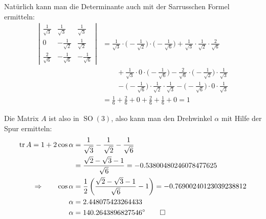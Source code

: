 \begin{loesung}
\begin{teilaufgaben}
Natürlich kann man die Determinante auch mit der Sarrusschen Formel ermitteln:
\begin{align*}
\left|
\begin{matrix}
\frac1{\sqrt{3}}&\frac1{\sqrt{3}}&\frac1{\sqrt{3}}\\
0&-\frac1{\sqrt{2}}&\frac1{\sqrt{2}}\\
\frac2{\sqrt{6}}&-\frac1{\sqrt{6}}&-\frac1{\sqrt{6}}
\end{matrix}
\right|
&=
\frac1{\sqrt{3}}\cdot\biggl(-\frac1{\sqrt{2}}\biggr)\cdot\biggl(-\frac1{\sqrt{6}}\biggr)
+
\frac1{\sqrt{3}}\cdot\frac1{\sqrt{2}}\cdot\frac2{\sqrt{6}}
\\
&\qquad 
+
\frac1{\sqrt{3}}\cdot0\cdot\biggl(-\frac1{\sqrt{6}}\biggr)
-
\frac2{\sqrt{6}}\cdot\biggl(-\frac1{\sqrt{2}}\biggr)\cdot\frac1{\sqrt{3}}
\\
&\qquad
-
\biggl(-\frac1{\sqrt{6}}\biggr)\cdot\frac1{\sqrt{2}}\cdot \frac1{\sqrt{3}}
-
\biggl(-\frac1{\sqrt{6}}\biggr)\cdot0\cdot\frac1{\sqrt{3}}
\\
&=
\frac16+\frac26+0+\frac26+\frac16+0=1
\end{align*}
\item
Die Matrix $A$ ist also in $\operatorname{SO}(3)$, also kann man den
Drehwinkel $\alpha$ mit Hilfe der Spur ermitteln:
\begin{align*}
\operatorname{tr} A=1+2\cos\alpha&=\frac1{\sqrt{3}}-\frac1{\sqrt{2}}-\frac1{\sqrt{6}}
\\
&=\frac{\sqrt{2}-\sqrt{3}-1}{\sqrt{6}}=-0.53800480246078477625
\\
\Rightarrow\qquad
\cos\alpha&=\frac12\left(
\frac{\sqrt{2}-\sqrt{3}-1}{\sqrt{6}}-1
\right)=-0.76900240123039238812
\\
\alpha&=2.448075423264433\\
\alpha&=140.2643896827546^\circ
\qedhere
\end{align*}
\end{teilaufgaben}
\end{loesung}

